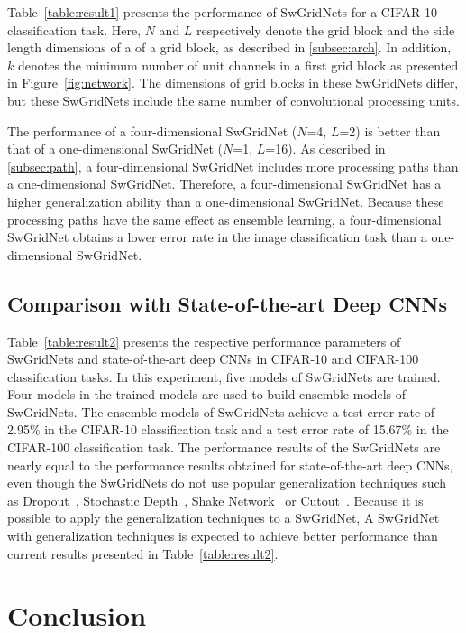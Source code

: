 \documentclass[10pt,twocolumn,letterpaper]{article}
\begin{document}
Table~\ref{table:result1} presents the performance of SwGridNets for a CIFAR-10 classification task.
Here, $N$ and $L $ respectively denote the grid block and the side length dimensions of a of a grid block, as described in \ref{subsec:arch}.
In addition, $k$ denotes the minimum number of unit channels in a first grid block as presented in Figure~\ref{fig:network}.
The dimensions of grid blocks in these SwGridNets differ,
but these SwGridNets include the same number of convolutional processing units.

The performance of a four-dimensional SwGridNet ($N$=4, $L$=2) is better than that of a one-dimensional SwGridNet ($N$=1, $L$=16).
As described in \ref{subsec:path}, a four-dimensional SwGridNet includes more processing paths than a one-dimensional SwGridNet.
Therefore, a four-dimensional SwGridNet has a higher generalization ability than a one-dimensional SwGridNet.
Because these processing paths have the same effect as ensemble learning,
a four-dimensional SwGridNet obtains a lower error rate in the image classification task than a one-dimensional SwGridNet.

\subsection{Comparison with State-of-the-art Deep CNNs}

Table~\ref{table:result2} presents the respective performance parameters of SwGridNets and state-of-the-art deep CNNs in CIFAR-10 and CIFAR-100 classification tasks.
In this experiment, five models of SwGridNets are trained. Four models in the trained models are used to build ensemble models of SwGridNets.
The ensemble models of SwGridNets achieve a test error rate of 2.95\% in the CIFAR-10 classification task
and a test error rate of 15.67\% in the CIFAR-100 classification task.
The performance results of the SwGridNets are nearly equal to the performance results obtained for state-of-the-art deep CNNs,
even though the SwGridNets do not use popular generalization techniques such as Dropout~\cite{Dropout}, Stochastic Depth~\cite{StochasticResNet}, Shake Network~\cite{ShakeNet} or Cutout~\cite{Cutout}.
Because it is possible to apply the generalization techniques to a SwGridNet,
A SwGridNet with generalization techniques is expected to achieve better performance than current results presented in Table~\ref{table:result2}.

\section{Conclusion}
\label{sec:conclusion}
\end{document}
